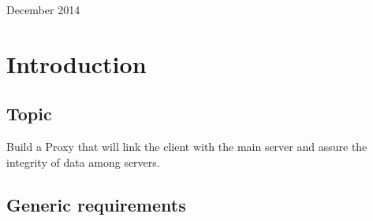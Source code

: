 \documentclass[12pt]{article}
\begin{document}
\begin{titlepage}
\begin{center}
      \vspace{5 mm}


      {\large December 2014}\\[3cm] %




      \vfill %
      \end{center}
      \end{titlepage}



  \section{Introduction}

  \subsection{Topic}

   Build a Proxy that will link the client with the main server and assure the integrity 
   of data among servers.

  \subsection{Generic requirements}
\end{document}
